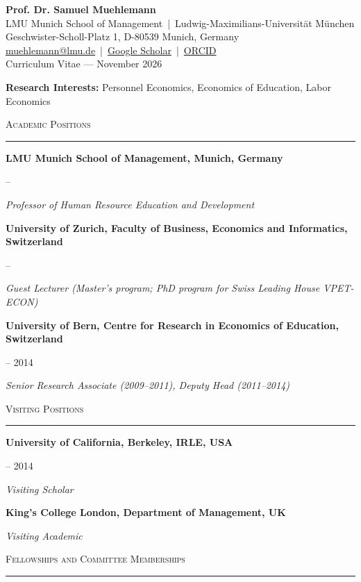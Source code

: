 \documentclass[11pt,a4paper]{article}
\newcommand{\cvsection}[1]{%
  \vspace{1.1em}%
  {\large\textsc{#1}}\par
  \vspace{0.15em}\hrule\vspace{0.65em}%
}
\newcommand{\cvdated}[2]{%
  \begin{minipage}[t]{\dimexpr\linewidth-6.2em\relax}#1\end{minipage}%
  \hfill
  \begin{minipage}[t]{5.8em}\raggedleft #2\end{minipage}%
}
\newcommand{\cventry}[3]{%
  \cvdated{\textbf{#1}}{#2}\par
  {\itshape #3}\par\vspace{0.5em}%
}
\begin{document}
\begin{center}
  {\LARGE\bfseries Prof. Dr. Samuel Muehlemann}\\[0.5em]
  LMU Munich School of Management \,|\, Ludwig-Maximilians-Universit\"at M\"unchen\\
  Geschwister-Scholl-Platz 1, D-80539 Munich, Germany\\
  \href{mailto:muehlemann@lmu.de}{muehlemann@lmu.de} \,|\,
  \href{https://scholar.google.de/citations?user=mkNGu5kAAAAJ&hl=de}{Google Scholar} \,|\,
  \href{https://orcid.org/0000-0001-7361-6787}{ORCID}\\[0.7em]
  {\large Curriculum Vitae --- November 2026}
\end{center}

\vspace{0.4em}
\textbf{Research Interests:} Personnel Economics, Economics of Education, Labor Economics

\cvsection{Academic Positions}

\cventry{LMU Munich School of Management, Munich, Germany}{2014 --}
  {Professor of Human Resource Education and Development}

\cventry{University of Zurich, Faculty of Business, Economics and Informatics, Switzerland}{2015 --}
  {Guest Lecturer (Master's program; PhD program for Swiss Leading House VPET-ECON)}

\cventry{University of Bern, Centre for Research in Economics of Education, Switzerland}{2009 -- 2014}
  {Senior Research Associate (2009--2011), Deputy Head (2011--2014)}

\cvsection{Visiting Positions}

\cventry{University of California, Berkeley, IRLE, USA}{2013 -- 2014}
  {Visiting Scholar}

\cventry{King's College London, Department of Management, UK}{2009}
  {Visiting Academic}

\cvsection{Fellowships and Committee Memberships}
\end{document}
